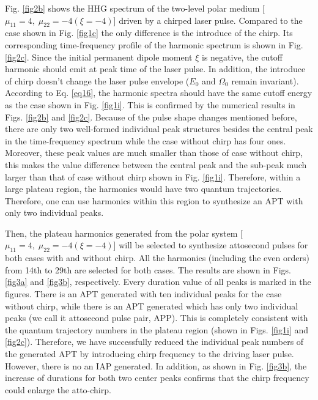 \documentclass[10pt,letterpaper]{article}
\begin{document}
Fig. \ref{fig2b} shows the HHG spectrum of the two-level polar medium [$\mu_{11}=4,\;\mu_{22}=-4(\xi=-4)$] driven by a chirped laser pulse. Compared to the case shown in Fig. \ref{fig1c} the only difference is the introduce of the chirp. Its corresponding time-frequency profile of the harmonic spectrum is shown in Fig. \ref{fig2c}. Since the initial permanent dipole moment $\xi$ is negative, the cutoff harmonic should emit at peak time of the laser pulse. In addition, the introduce of chirp doesn't change the laser pulse envelope ($E_{0}$ and $\Omega_0$ remain invariant). According to Eq. \ref{eq16}, the harmonic spectra should have the same cutoff energy as the case shown in Fig. \ref{fig1i}. This is confirmed by the numerical results in Figs. \ref{fig2b} and \ref{fig2c}. Because of the pulse shape changes mentioned before, there are only two well-formed individual peak structures besides the central peak in the time-frequency spectrum while the case without chirp has four ones. Moreover, these peak values are much smaller than those of case without chirp, this makes the value difference between the central peak and the sub-peak much larger than that of case without chirp shown in Fig. \ref{fig1i}. Therefore, within a large plateau region, the harmonics would have two quantum trajectories. Therefore, one can use harmonics within this region to synthesize an APT with only two individual peaks. 

Then, the plateau harmonics generated from the polar system [$\mu_{11}=4,\;\mu_{22}=-4(\xi=-4)$] will be selected to synthesize attosecond pulses for both cases with and without chirp. All the harmonics (including the even orders) from 14th to 29th are selected for both cases. The results are shown in Figs. \ref{fig3a} and \ref{fig3b}, respectively. Every duration value of all peaks is marked in the figures. There is an APT generated with ten individual peaks for the case without chirp, while there is an APT generated which has only two individual peaks (we call it attosecond pulse pair, APP). This is completely consistent with the quantum trajectory numbers in the plateau region (shown in Figs. \ref{fig1i} and \ref{fig2c}). Therefore, we have successfully reduced the individual peak numbers of the generated APT by introducing chirp frequency to the driving laser pulse. However, there is no an IAP generated. In addition, as shown in Fig. \ref{fig3b}, the increase of durations for both two center peaks confirms that the chirp frequency could enlarge the atto-chirp.
\end{document}
